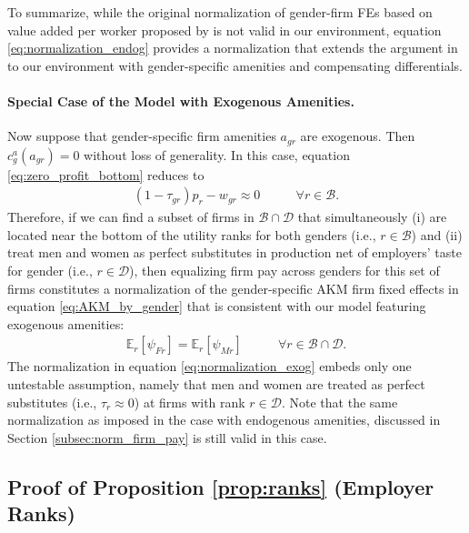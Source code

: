To summarize, while the original normalization of gender-firm FEs based on value added per worker proposed by \citet{CardCardosoKline2016} is not valid in our environment, equation \eqref{eq:normalization_endog} provides a normalization that extends the argument in \citet{CardCardosoKline2016} to our environment with gender-specific amenities and compensating differentials.


\paragraph{Special Case of the Model with Exogenous Amenities.}

Now suppose that gender-specific firm amenities $a_{gr}$ are exogenous. Then $c_{g}^{a}(a_{gr}) = 0$ without loss of generality. In this case, equation \eqref{eq:zero_profit_bottom} reduces to
%
\begin{align}
    (1 - \tau_{gr}) p_{r} - w_{gr} \approx 0 \qquad &\forall r \in \mathcal{B}. \label{eq:exog_amenities}
\end{align}
%
Therefore, if we can find a subset of firms in $\mathcal{B} \cap \mathcal{D}$ that simultaneously (i) are located near the bottom of the utility ranks for both genders (i.e., $r \in \mathcal{B}$) and (ii) treat men and women as perfect substitutes in production net of employers' taste for gender (i.e., $r \in \mathcal{D}$), then equalizing firm pay across genders for this set of firms constitutes a normalization of the gender-specific AKM firm fixed effects in equation \eqref{eq:AKM_by_gender} that is consistent with our model featuring exogenous amenities:
%
\begin{align}
    \mathbb{E}_{r}[\psi_{Fr}] = \mathbb{E}_{r}[\psi_{Mr}] \qquad &\forall r \in \mathcal{B} \cap \mathcal{D}. \label{eq:normalization_exog}
\end{align}
%
The normalization in equation \eqref{eq:normalization_exog} embeds only one untestable assumption, namely that men and women are treated as perfect substitutes (i.e., $\tau_{r} \approx 0$) at firms with rank $r \in \mathcal{D}$. Note that the same normalization as imposed in the case with endogenous amenities, discussed in Section \ref{subsec:norm_firm_pay} is still valid in this case.


\subsection{Proof of Proposition \ref{prop:ranks} (Employer Ranks)\label{app:proof_employer_ranks}}

